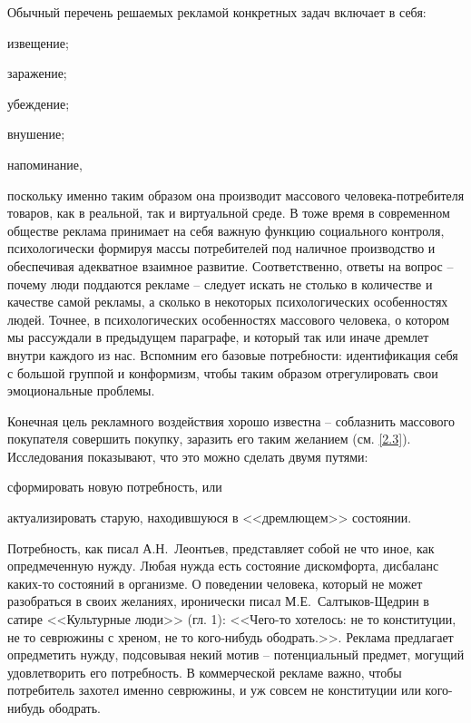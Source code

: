 Обычный перечень решаемых рекламой конкретных задач включает в себя:
\begin{enumerate*}[label=\asbuk*)]
\item извещение;
\item заражение;
\item убеждение;
\item внушение;
\item напоминание,
\end{enumerate*}
поскольку именно таким образом она производит массового
человека-потребителя товаров, как в реальной, так и виртуальной среде.
В тоже время в современном обществе реклама принимает на себя важную
функцию социального контроля, психологически формируя массы
потребителей под наличное производство и обеспечивая адекватное взаимное
развитие\autocite{feofanov1987}. Соответственно, ответы на вопрос -- почему люди поддаются рекламе --
следует искать не столько в количестве и качестве самой рекламы,
а сколько в некоторых психологических особенностях людей. Точнее, в
психологических особенностях массового человека, о котором мы рассуждали в
предыдущем параграфе, и который так или иначе дремлет внутри каждого из нас.
Вспомним его базовые потребности: идентификация себя с большой группой и
конформизм, чтобы таким образом отрегулировать свои эмоциональные проблемы.

Конечная цель рекламного воздействия хорошо известна -- соблазнить массового
покупателя совершить покупку, заразить его таким желанием (см. \ref{2.3}).
Исследования показывают, что это можно сделать двумя путями:
\begin{enumerate*}[label=\asbuk*)]
    \item сформировать новую потребность, или
    \item актуализировать старую, находившуюся в <<дремлющем>> состоянии.
\end{enumerate*}
Потребность, как писал А.Н.~Леонтьев, представляет собой не что иное,
как опредмеченную нужду\autocite{leontev2012}.
Любая нужда есть состояние дискомфорта, дисбаланс каких-то состояний в организме.
О поведении человека, который не может разобраться в своих желаниях,
иронически писал М.Е.~Салтыков-Щедрин в сатире <<Культурные люди>> (гл. 1):
<<Чего-то хотелось: не то конституции, не то севрюжины с хреном, не то кого-нибудь
ободрать.>>\autocite[][295]{saltikov2000}. Реклама предлагает опредметить нужду,
подсовывая некий мотив -- потенциальный предмет, могущий удовлетворить его
потребность. В коммерческой рекламе важно, чтобы потребитель захотел именно
севрюжины, и уж совсем не конституции или кого-нибудь ободрать.


